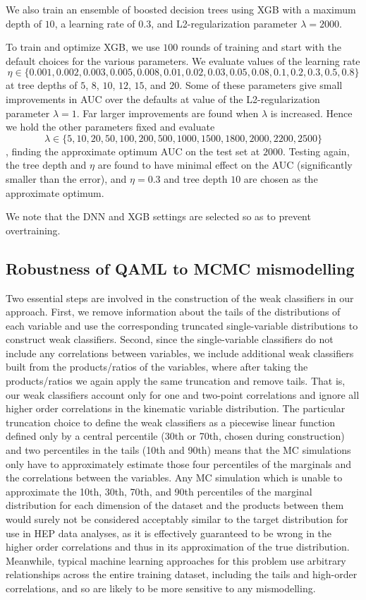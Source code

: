 We  also train an ensemble of boosted decision trees using XGB \cite{xgboost}
with a maximum depth of $10$, a learning rate of $0.3$, and L2-regularization parameter $\lambda=2000$.

To train and optimize XGB, we use $100$ rounds of training and start with the default choices for the various parameters. We  evaluate values of the learning rate $$\eta\in\{0.001,0.002,0.003,0.005,0.008,0.01,0.02,0.03,0.05,0.08,0.1,0.2,0.3,0.5,0.8\}$$
at tree depths of $5$, $8$, $10$, $12$, $15$, and $20$. Some of these parameters give small improvements in AUC over the defaults at value of the L2-regularization parameter $\lambda=1$. Far larger improvements are found when $\lambda$ is increased.  Hence  we hold the other parameters fixed and  evaluate $$\lambda\in\{5,10,20,50,100,200,500,1000,1500,1800,2000,2200,2500\}$$, finding the approximate optimum AUC on the test set at $2000$. Testing again, the tree depth and $\eta$ are  found to have minimal effect on the AUC (significantly smaller than the error), and $\eta=0.3$ and tree depth $10$ are  chosen as the approximate optimum.

We note that the DNN and XGB settings are selected so as to prevent overtraining.

\subsection{Robustness of QAML to MCMC mismodelling}
Two essential steps are involved in the construction of the weak classifiers in our approach. First, we remove information about the tails of the distributions of each variable and use the corresponding truncated single-variable distributions to construct weak classifiers. Second, since the single-variable classifiers do not include any correlations between variables, we include additional weak classifiers built from the products/ratios of the variables, where after taking the products/ratios we again apply the same truncation and remove tails. That is, our weak classifiers account only for one and two-point correlations and ignore all higher order correlations in the kinematic variable distribution.
The particular truncation choice to define the weak classifiers as a piecewise linear function defined only by a central percentile (30th or 70th, chosen during construction) and two percentiles in the tails (10th and 90th) means that the MC simulations only have to approximately estimate those four percentiles of the marginals and the correlations between the variables. Any MC simulation which is unable to approximate the 10th, 30th, 70th, and 90th percentiles of the marginal distribution for each dimension of the dataset and the products between them would surely not be considered acceptably similar to the target distribution for use in HEP data analyses, as it is effectively guaranteed to be wrong in the higher order correlations and thus in its approximation of the true distribution. Meanwhile, typical machine learning approaches for this problem use arbitrary relationships across the entire training dataset, including the tails and high-order correlations, and so are likely to be more sensitive to any mismodelling.


